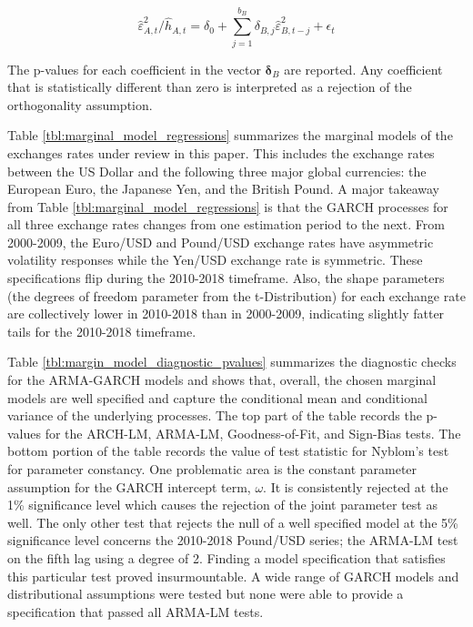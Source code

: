 \documentclass[12pt]{article}
\begin{document}
\begin{equation}  \label{eq:var_orthogonality_assumption}
	\hat{\varepsilon}_{A,t}^{2} / \hat{h}_{A,t} = \delta_{0} + \sum_{j=1}^{b_{B}}\delta_{B,j} \hat{\varepsilon}^{2}_{B, t-j} + \epsilon_{t}
\end{equation}

The p-values for each coefficient in the vector $\boldsymbol{\delta}_{B}$ are reported. Any coefficient that is statistically different than zero is interpreted as a rejection of the orthogonality assumption.

Table \ref{tbl:marginal_model_regressions} summarizes the marginal models of the exchanges rates under review in this paper. This includes the exchange rates between the US Dollar and the following three major global currencies: the European Euro, the Japanese Yen, and the British Pound. A major takeaway from Table \ref{tbl:marginal_model_regressions} is that the GARCH processes for all three exchange rates changes from one estimation period to the next. From 2000-2009, the Euro/USD and Pound/USD exchange rates have asymmetric volatility responses while the Yen/USD exchange rate is symmetric. These specifications flip during the 2010-2018 timeframe. Also, the shape parameters (the degrees of freedom parameter from the t-Distribution) for each exchange rate are collectively lower in 2010-2018 than in 2000-2009, indicating slightly fatter tails for the 2010-2018 timeframe.

Table \ref{tbl:margin_model_diagnostic_pvalues} summarizes the diagnostic checks for the ARMA-GARCH models and shows that, overall, the chosen marginal models are well specified and capture the conditional mean and conditional variance of the underlying processes. The top part of the table records the p-values for the ARCH-LM, ARMA-LM, Goodness-of-Fit, and Sign-Bias tests. The bottom portion of the table records the value of test statistic for Nyblom's test for parameter constancy. One problematic area is the constant parameter assumption for the GARCH intercept term, $\omega$. It is consistently rejected at the 1\% significance level which causes the rejection of the joint parameter test as well. The only other test that rejects the null of a well specified model at the 5\% significance level concerns the 2010-2018 Pound/USD series; the ARMA-LM test on the fifth lag using a degree of 2. Finding a model specification that satisfies this particular test proved insurmountable. A wide range of GARCH models and distributional assumptions were tested but none were able to provide a specification that passed all ARMA-LM tests.
\end{document}
